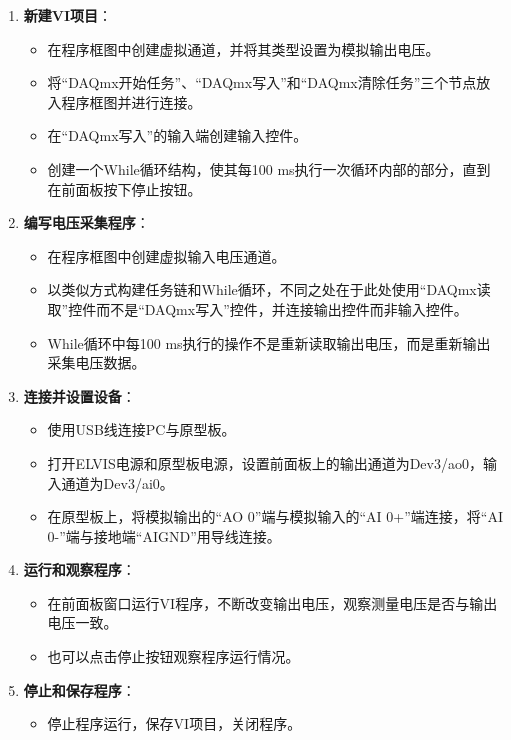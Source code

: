 \documentclass[UTF-8,twoside,cs4size]{ctexart}
\begin{document}
\begin{enumerate}
    \item \textbf{新建VI项目}：
    \begin{itemize}
        \item 在程序框图中创建虚拟通道，并将其类型设置为模拟输出电压。
        \item 将“DAQmx开始任务”、“DAQmx写入”和“DAQmx清除任务”三个节点放入程序框图并进行连接。
        \item 在“DAQmx写入”的输入端创建输入控件。
        \item 创建一个While循环结构，使其每100 ms执行一次循环内部的部分，直到在前面板按下停止按钮。
    \end{itemize}

    \item \textbf{编写电压采集程序}：
    \begin{itemize}
        \item 在程序框图中创建虚拟输入电压通道。
        \item 以类似方式构建任务链和While循环，不同之处在于此处使用“DAQmx读取”控件而不是“DAQmx写入”控件，并连接输出控件而非输入控件。
        \item While循环中每100 ms执行的操作不是重新读取输出电压，而是重新输出采集电压数据。
    \end{itemize}

    \item \textbf{连接并设置设备}：
    \begin{itemize}
        \item 使用USB线连接PC与原型板。
        \item 打开ELVIS电源和原型板电源，设置前面板上的输出通道为Dev3/ao0，输入通道为Dev3/ai0。
        \item 在原型板上，将模拟输出的“AO 0”端与模拟输入的“AI 0+”端连接，将“AI 0-”端与接地端“AIGND”用导线连接。
    \end{itemize}

    \item \textbf{运行和观察程序}：
    \begin{itemize}
        \item 在前面板窗口运行VI程序，不断改变输出电压，观察测量电压是否与输出电压一致。
        \item 也可以点击停止按钮观察程序运行情况。
    \end{itemize}

    \item \textbf{停止和保存程序}：
    \begin{itemize}
        \item 停止程序运行，保存VI项目，关闭程序。
    \end{itemize}
\end{enumerate}
\end{document}

